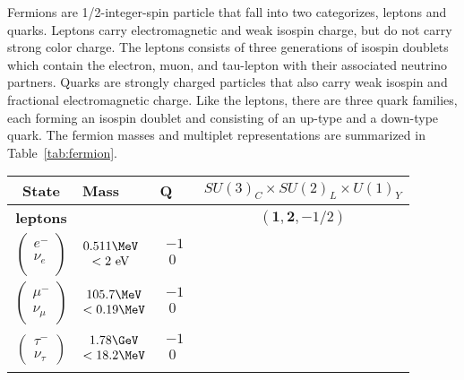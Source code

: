 Fermions are 1/2-integer-spin particle that fall into two categorizes, leptons and quarks.  Leptons carry electromagnetic and weak isospin charge, but do not carry strong color charge.  The leptons consists of three generations of isospin doublets which contain the electron, muon, and tau-lepton with their associated neutrino partners.  Quarks are strongly charged particles that also carry weak isospin and fractional electromagnetic charge.  Like the leptons, there are three quark families, each forming an isospin doublet and consisting of an up-type and a down-type quark.  The fermion masses and multiplet representations are summarized in Table~\ref{tab:fermion}.
\begin{table}[!htp]
\centering
\small
\begin{tabular}{|cllc|}
\hline
State  & Mass & Q & $SU(3)_{C} \times SU(2)_{L} \times U(1)_{Y}$ \\
\hline \hline
\textbf{leptons}&&&$(\mathbf{1}, \mathbf{2}, -1/2)$\\
\hline
$\begin{pmatrix}
e^- \\
\nu_e\\
\end{pmatrix}$
&$\begin{matrix}
0.511\MeV \\
<2~\mathrm{eV}\\
\end{matrix}$
&$\begin{matrix}
-1\\
~0\\
\end{matrix}$&\\
\hline
$\begin{pmatrix} \mu^-\\ \nu_\mu \end{pmatrix}$
 &$\begin{matrix} 105.7\MeV\\  <0.19\MeV \\ \end{matrix}$
  &$\begin{matrix} -1\\  ~0 \\ \end{matrix}$&\\
\hline
$\begin{pmatrix} \tau^- \\ \nu_\tau \end{pmatrix}$
&$\begin{matrix} 1.78\GeV  \\ <18.2\MeV \end{matrix}$
  &$\begin{matrix} -1\\  ~0 \\ \end{matrix}$&\\  
\hline 


\end{tabular}
\end{table}
